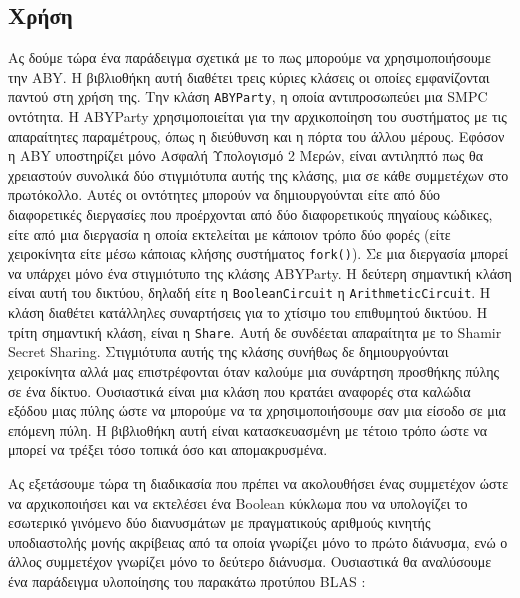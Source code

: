 \subsection{Χρήση}

Ας δούμε τώρα ένα παράδειγμα σχετικά με το πως μπορούμε να χρησιμοποιήσουμε την ABY. Η βιβλιοθήκη αυτή διαθέτει τρεις κύριες κλάσεις οι οποίες εμφανίζονται παντού στη χρήση της. Την κλάση \texttt{ABYParty}, η οποία αντιπροσωπεύει μια SMPC οντότητα. Η ABYParty χρησιμοποιείται για την αρχικοποίηση του συστήματος με τις απαραίτητες παραμέτρους, όπως η διεύθυνση και η πόρτα του άλλου μέρους. Εφόσον η ABY υποστηρίζει μόνο Ασφαλή Υπολογισμό 2 Μερών, είναι αντιληπτό πως θα χρειαστούν συνολικά δύο στιγμιότυπα αυτής της κλάσης, μια σε κάθε συμμετέχων στο πρωτόκολλο. Αυτές οι οντότητες μπορούν να δημιουργούνται είτε από δύο διαφορετικές διεργασίες που προέρχονται από δύο διαφορετικούς πηγαίους κώδικες, είτε από μια διεργασία η οποία εκτελείται με κάποιον τρόπο δύο φορές (είτε χειροκίνητα είτε μέσω κάποιας κλήσης συστήματος \texttt{fork()}). Σε μια διεργασία μπορεί να υπάρχει μόνο ένα στιγμιότυπο της κλάσης ABYParty. Η δεύτερη σημαντική κλάση είναι αυτή του δικτύου, δηλαδή είτε η \texttt{BooleanCircuit}  η \texttt{ArithmeticCircuit}. Η κλάση διαθέτει κατάλληλες συναρτήσεις για το χτίσιμο του επιθυμητού δικτύου. Η τρίτη σημαντική κλάση, είναι η \texttt{Share}. Αυτή δε συνδέεται απαραίτητα με το Shamir Secret Sharing. Στιγμιότυπα αυτής της κλάσης συνήθως δε δημιουργούνται χειροκίνητα αλλά μας επιστρέφονται όταν καλούμε μια συνάρτηση προσθήκης πύλης σε ένα δίκτυο. Ουσιαστικά είναι μια κλάση που κρατάει αναφορές στα καλώδια εξόδου μιας πύλης ώστε να μπορούμε να τα χρησιμοποιήσουμε σαν μια είσοδο σε μια επόμενη πύλη. Η βιβλιοθήκη αυτή είναι κατασκευασμένη με τέτοιο τρόπο ώστε να μπορεί να τρέξει τόσο τοπικά όσο και απομακρυσμένα.

Ας εξετάσουμε τώρα τη διαδικασία που πρέπει να ακολουθήσει ένας συμμετέχον ώστε να αρχικοποιήσει και να εκτελέσει ένα Boolean κύκλωμα που να υπολογίζει το εσωτερικό γινόμενο δύο διανυσμάτων με πραγματικούς αριθμούς κινητής υποδιαστολής μονής ακρίβειας από τα οποία γνωρίζει μόνο το πρώτο διάνυσμα, ενώ ο άλλος συμμετέχον γνωρίζει μόνο το δεύτερο διάνυσμα. Ουσιαστικά θα αναλύσουμε ένα παράδειγμα υλοποίησης του παρακάτω προτύπου BLAS :

\begin{figure}[h!]
    \begin{center}
        \inputminted[fontsize=\scriptsize,frame=single]{cpp}{./01_body/code/aby-example-step-0.cpp}
    \end{center}
\end{figure}

